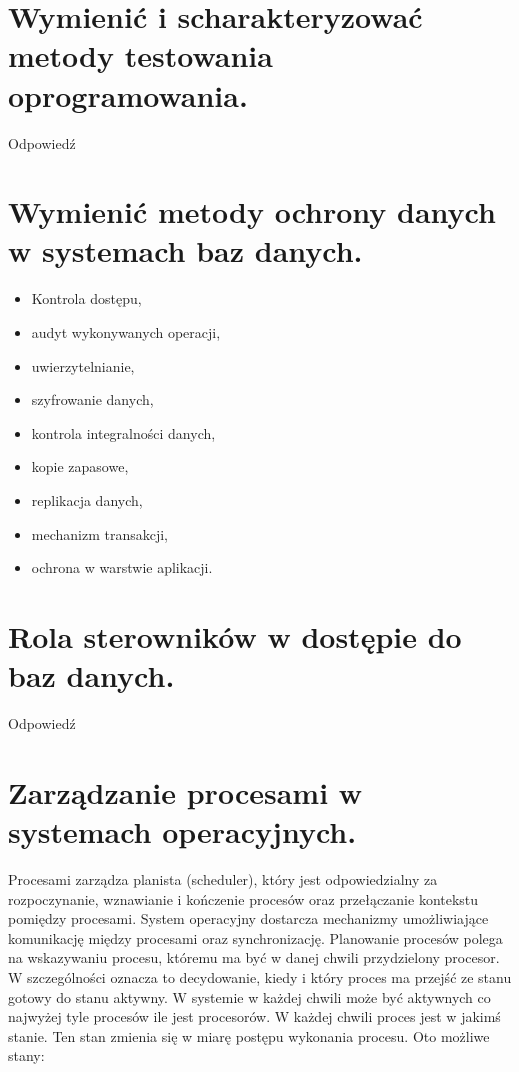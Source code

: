 \documentclass[12pt,a4paper]{article}
\begin{document}
	\section{Wymienić i scharakteryzować metody testowania oprogramowania.}
	Odpowiedź

	\section{Wymienić metody ochrony danych w systemach baz danych.}
	\begin{multicols}{2}
		\begin{itemize}
			\item Kontrola dostępu,
			\item audyt wykonywanych operacji,
			\item uwierzytelnianie,
			\item szyfrowanie danych,
			\item kontrola integralności danych,
			\item kopie zapasowe,
			\item replikacja danych,
			\item mechanizm transakcji,
			\item ochrona w warstwie aplikacji.
		\end{itemize}
	\end{multicols}

	\section{Rola sterowników w dostępie do baz danych.}
	Odpowiedź

	\section{Zarządzanie procesami w systemach operacyjnych.}
	Procesami zarządza planista (scheduler), który jest odpowiedzialny za rozpoczynanie, wznawianie i kończenie procesów oraz przełączanie kontekstu pomiędzy procesami. System operacyjny dostarcza mechanizmy umożliwiające komunikację między procesami oraz synchronizację. Planowanie procesów polega na wskazywaniu procesu, któremu ma być w danej chwili przydzielony procesor. W szczególności oznacza to decydowanie, kiedy i który proces ma przejść ze stanu gotowy do stanu aktywny. W systemie w każdej chwili może być aktywnych co najwyżej tyle procesów ile jest procesorów. W każdej chwili proces jest w jakimś stanie. Ten stan zmienia się w miarę postępu wykonania procesu. Oto możliwe stany:
	
\end{document}
